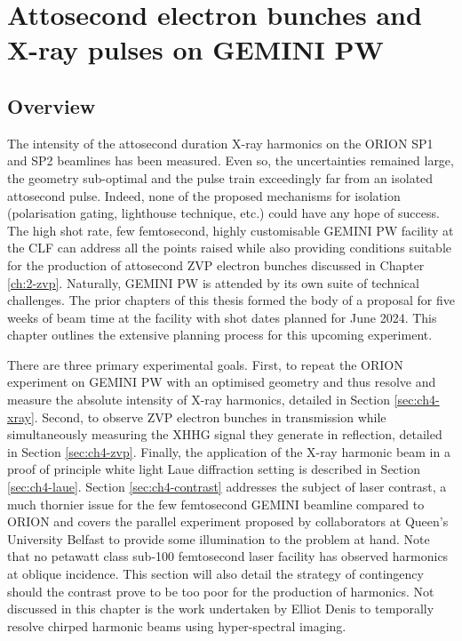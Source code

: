 \chapter{\label{ch:4-gemini}Attosecond electron bunches and X-ray pulses on GEMINI PW} 

\minitoc

\section{Overview}
The intensity of the attosecond duration X-ray harmonics on the ORION SP1 and SP2 beamlines has been measured. Even so, the uncertainties remained large, the geometry sub-optimal and the pulse train exceedingly far from an isolated attosecond pulse. Indeed, none of the proposed mechanisms for isolation (polarisation gating, lighthouse technique, etc.) could have any hope of success. The high shot rate, few femtosecond, highly customisable GEMINI PW facility at the CLF can address all the points raised while also providing conditions suitable for the production of attosecond ZVP electron bunches discussed in Chapter \ref{ch:2-zvp}. Naturally, GEMINI PW is attended by its own suite of technical challenges. The prior chapters of this thesis formed the body of a proposal for five weeks of beam time at the facility with shot dates planned for June 2024. This chapter outlines the extensive planning process for this upcoming experiment.

There are three primary experimental goals. First, to repeat the ORION experiment on GEMINI PW with an optimised geometry and thus resolve and measure the absolute intensity of X-ray harmonics, detailed in Section \ref{sec:ch4-xray}. Second, to observe ZVP electron bunches in transmission while simultaneously measuring the XHHG signal they generate in reflection, detailed in Section \ref{sec:ch4-zvp}. Finally, the application of the X-ray harmonic beam in a proof of principle white light Laue diffraction setting is described in Section \ref{sec:ch4-laue}. Section \ref{sec:ch4-contrast} addresses the subject of laser contrast, a much thornier issue for the few femtosecond GEMINI beamline compared to ORION and covers the parallel experiment proposed by collaborators at Queen's University Belfast to provide some illumination to the problem at hand. Note that no petawatt class sub-100 femtosecond laser facility has observed harmonics at oblique incidence. This section will also detail the strategy of contingency should the contrast prove to be too poor for the production of harmonics. Not discussed in this chapter is the work undertaken by Elliot Denis to temporally resolve chirped harmonic beams using hyper-spectral imaging.

